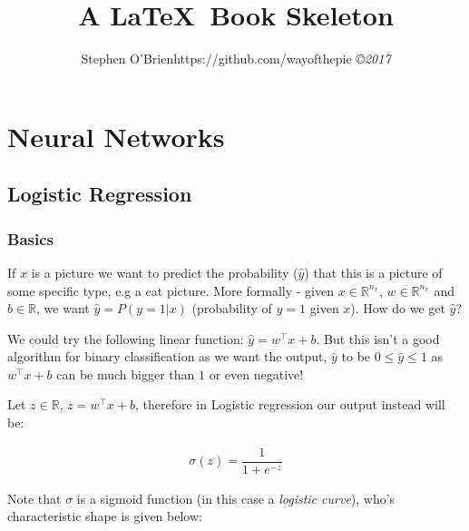 \documentclass[12pt,reqno]{book}      %
\title{A \LaTeX \ Book Skeleton  }
\author{\htmladdnormallink           %
{Stephen O'Brien}{https://github.com/wayofthepie}
{\small\em \copyright 2017 }}
\date{ }
\begin{document}
\maketitle
{}
\tableofcontents

\chapter{Neural Networks}
\section{Logistic Regression}
\subsection{Basics}
If $x$ is a picture we want to predict the probability ($\hat{y}$) that this is a picture of some specific type, e.g a cat picture. More formally - given $x \in \mathbb{R}^{n_{x}}$, $w \in \mathbb{R}^{n_{x}}$ and 
$b \in \mathbb{R}$, we want $\hat{y} = P(y=1 | x)$ (probability of $y = 1$ given $x$). How do we get $\hat{y}$?

We could try the following linear function: $\hat{y} = w^\intercal x + b$. But this isn't a good algorithm for binary classification as we want the output, $\hat{y}$ to be $0 \leq \hat{y} \leq 1$ as $w^\intercal x + b$ can be much bigger than $1$ or even negative!

Let $z \in \mathbb{R}$,  $z = w^\intercal x + b$, therefore in Logistic regression our output instead will be:

\begin{align}
\sigma(z) = \dfrac{1}{1 + e^{-z}}
\end{align}

Note that $\sigma$ is a sigmoid function (in this case a \textit{logistic curve}), who's characteristic shape is given below:

\begin{center}
\end{center}
\end{document}
